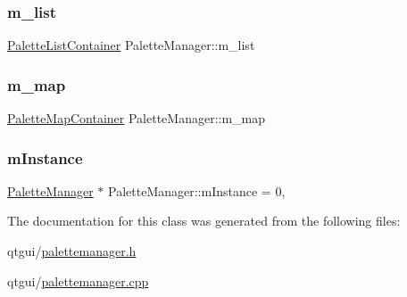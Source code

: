 \subsubsection{\texorpdfstring{m\_list}{m\_list}}
{\footnotesize\ttfamily \mbox{\hyperlink{class_palette_manager_ab2eef0ecf4e5473d79a6943ddaefe60f}{Palette\+List\+Container}} Palette\+Manager\+::m\+\_\+list\hspace{0.3cm}{\ttfamily [protected]}}

\mbox{\label{class_palette_manager_a207d870982cd43c3e5100c7ce166d2fa}} 
\subsubsection{\texorpdfstring{m\_map}{m\_map}}
{\footnotesize\ttfamily \mbox{\hyperlink{class_palette_manager_aa850f90513b7da9d828034105a1390e6}{Palette\+Map\+Container}} Palette\+Manager\+::m\+\_\+map\hspace{0.3cm}{\ttfamily [protected]}}

\mbox{\label{class_palette_manager_a3effdec723c4def9fb3e79c10b211149}} 
\subsubsection{\texorpdfstring{mInstance}{mInstance}}
{\footnotesize\ttfamily \mbox{\hyperlink{class_palette_manager}{Palette\+Manager}} $\ast$ Palette\+Manager\+::m\+Instance = 0\hspace{0.3cm}{\ttfamily [static]}, {\ttfamily [protected]}}



The documentation for this class was generated from the following files\+:\begin{DoxyCompactItemize}
\item 
qtgui/\mbox{\hyperlink{palettemanager_8h}{palettemanager.\+h}}\item 
qtgui/\mbox{\hyperlink{palettemanager_8cpp}{palettemanager.\+cpp}}\end{DoxyCompactItemize}
